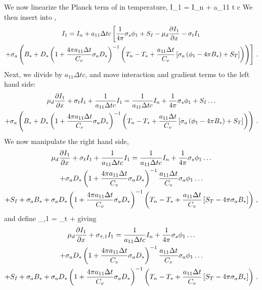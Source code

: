 We now linearize the Planck term of  in temperature,
\benum
I_1 = I_n + a_{11} \Delta t c  \pep
\label{eq:long_i_1_analytic}
\eenum
We then insert  into ,
\begin{multline}
I_1 = I_n + a_{11} \Delta t c \left[ \frac{1}{4\pi}\sigma_{s} \phi_1 + S_I - \mu_d \frac{\partial I_1}{\partial x} - \sigma_t I_1  \right. \\ 
\left. + \sigma_a \left(B_* + D_*\left(1 + \frac{4\pi a_{11} \Delta t}{C_v} \sigma_a D_*  \right)^{-1} \left( T_n - T_* + \frac{a_{11} \Delta t }{C_v} \left[ \sigma_a \left( \phi_1 - 4\pi   B_* \right) + S_T \right]  \right) \right) \right] \, .
\end{multline}
Next, we divide by $ a_{11} \Delta t c$, and move interaction and gradient terms to the left hand side:
\begin{multline}
\mu_d \frac{\partial I_1}{\partial x} + \sigma_t I_1 + \frac{1}{a_{11} \Delta t c} I_1 = \frac{1}{a_{11} \Delta t c}I_n + \frac{1}{4\pi}\sigma_{s} \phi_1 + S_I \dots \\
+ \sigma_a \left(B_* + D_*\left(1 + \frac{4\pi a_{11} \Delta t}{C_v} \sigma_a D_*  \right)^{-1} \left( T_n - T_* + \frac{a_{11} \Delta t }{C_v} \left[ \sigma_a \left( \phi_1 - 4\pi   B_* \right) + S_T \right]  \right) \right) \, .
\end{multline}
We now manipulate the right hand side,
\begin{multline}
\mu_d \frac{\partial I_1}{\partial x} + \sigma_t I_1 + \frac{1}{a_{11} \Delta t c} I_1 = \frac{1}{a_{11} \Delta t c}I_n + \frac{1}{4\pi}\sigma_{s} \phi_1  \dots \\ 
+  \sigma_a  D_*\left(1 + \frac{4\pi a_{11} \Delta t}{C_v} \sigma_a D_*  \right)^{-1} \frac{a_{11} \Delta t }{C_v} \sigma_a \phi_1  \dots \\
+ S_I + \sigma_a B_* 
+ \sigma_a D_*\left(1 + \frac{4\pi a_{11} \Delta t}{C_v} \sigma_a D_*  \right)^{-1} \left( T_n - T_* + \frac{a_{11} \Delta t }{C_v} \left[  S_T - 4\pi \sigma_a   B_*\right]  \right) \, ,
\end{multline}
and define
\benum
\sigma_{\tau,1} = \sigma_t +  \pec
\label{eq:tau_1_analytic}
\eenum
giving
\begin{multline}
\mu_d \frac{\partial I_1}{\partial x} + \sigma_{\tau,1} I_1 = \frac{1}{a_{11} \Delta t c}I_n + \frac{1}{4\pi}\sigma_{s} \phi_1  \dots \\ 
+  \sigma_a  D_*\left(1 + \frac{4\pi a_{11} \Delta t}{C_v} \sigma_a D_*  \right)^{-1} \frac{a_{11} \Delta t }{C_v} \sigma_a \phi_1  \dots \\
+ S_I + \sigma_a B_* 
+ \sigma_a D_*\left(1 + \frac{4\pi a_{11} \Delta t}{C_v} \sigma_a D_*  \right)^{-1} \left( T_n - T_* + \frac{a_{11} \Delta t }{C_v} \left[  S_T - 4\pi \sigma_a   B_*\right]  \right) \, .
\end{multline}
